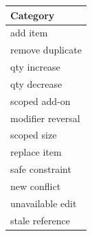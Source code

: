 \begin{tabular}{l}
\toprule
Category &  \\
\midrule
add item \\
remove duplicate \\
qty increase \\
qty decrease \\
scoped add-on \\
modifier reversal \\
scoped size \\
replace item \\
safe constraint \\
new conflict \\
unavailable edit \\
stale reference \\
\bottomrule
\end{tabular}
